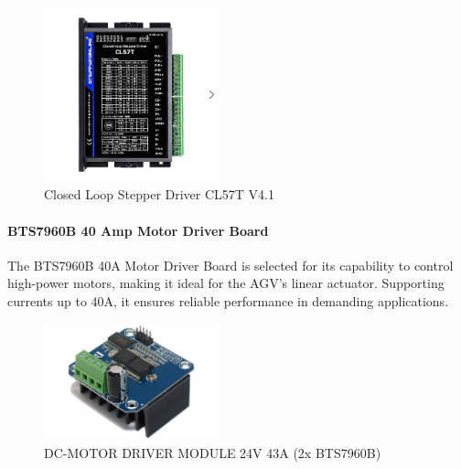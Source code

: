 \documentclass[../../main]{subfiles}
\begin{document}

\begin{figure}[H]
    \centering
    \includegraphics[width=0.45\textwidth]{fig/stepper_driver.png}
    \caption{ Closed Loop Stepper Driver CL57T V4.1 }
    \label{Stepper motor driver } %
\end{figure}

\paragraph{BTS7960B 40 Amp Motor Driver Board}

The BTS7960B 40A Motor Driver Board is selected for its capability to control 
high-power motors, making it ideal for the AGV’s linear actuator. 
Supporting currents up to 40A, it ensures reliable performance in demanding applications. 

\begin{figure}[H]
    \centering
    \includegraphics[width=0.45\textwidth]{fig/40_amp_driver.jpg}
    \caption{ DC-MOTOR DRIVER MODULE 24V 43A (2x BTS7960B) }
    \label{Linear actuator driver } %
\end{figure}
\end{document}
